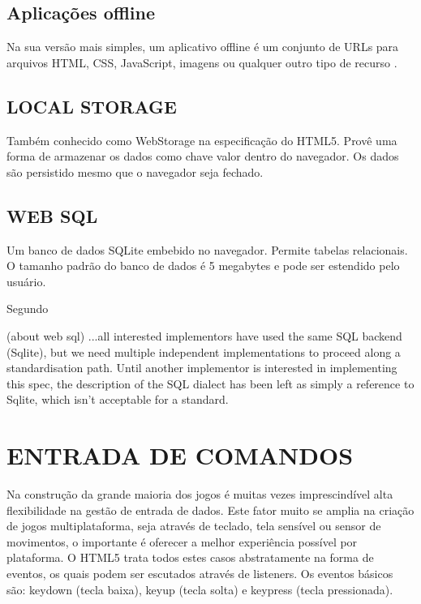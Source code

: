 \documentclass[
12pt,
a4paper,
portuges,
draft
]{report}
\renewenvironment{quote}
               {\list{}{\rightmargin\leftmargin}%
                \item\relax\fontsize{10}{12}}
               {\endlist}
\begin{document}
\subsection{Aplicações offline}

Na sua versão mais simples, um aplicativo offline é um conjunto de
URLs para arquivos HTML, CSS, JavaScript, imagens ou qualquer outro tipo
de recurso \autocite{diveIntohtml}.

\subsection{LOCAL STORAGE}

Também conhecido como WebStorage na especificação do HTML5. Provê
uma forma de armazenar os dados como chave valor dentro do navegador. Os
dados são persistido mesmo que o navegador seja fechado.

\subsection{WEB SQL}
Um banco de dados SQLite embebido no navegador. Permite
tabelas relacionais. O tamanho padrão do banco de dados é 5 megabytes
e pode ser estendido pelo usuário.

Segundo \cite{diveIntohtml}
\begin{quote}
(about web sql) ...all interested implementors have used the same
SQL backend (Sqlite), but we need multiple independent
implementations to proceed along a standardisation path. Until
another implementor is interested in implementing this spec, the
description of the SQL dialect has been left as simply a reference
to Sqlite, which isn't acceptable for a standard.
\end{quote}

\section{ENTRADA DE COMANDOS}

Na construção da grande maioria dos jogos é muitas vezes
imprescindível alta flexibilidade na gestão de entrada de dados.
Este fator muito se amplia na criação de jogos multiplataforma,
seja através de teclado, tela sensível ou sensor de movimentos, o
importante é oferecer a melhor experiência possível por plataforma.
O HTML5 trata todos estes casos abstratamente na forma de eventos, os
quais podem ser escutados através de listeners. Os eventos básicos
são: keydown (tecla baixa), keyup (tecla solta) e keypress (tecla
pressionada).
\end{document}
